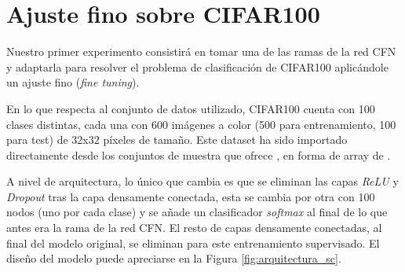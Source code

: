 \documentclass[10pt,a4paper]{article}
\begin{document}
\newpage
\section{Ajuste fino sobre CIFAR100}

Nuestro primer experimento consistirá en tomar una de las ramas de la red CFN y adaptarla para resolver el problema de clasificación de CIFAR100 aplicándole un ajuste fino (\textit{fine tuning}). 

En lo que respecta al conjunto de datos utilizado, CIFAR100 cuenta con 100 clases distintas, cada una con 600 imágenes a color (500 para entrenamiento, 100 para test) de 32x32 píxeles de tamaño. Este dataset ha sido importado directamente desde los conjuntos de muestra que ofrece , en forma de array de . 

A nivel de arquitectura, lo único que cambia es que se eliminan las capas \textit{ReLU} y \textit{Dropout} tras la capa densamente conectada, esta se cambia por otra con 100 nodos (uno por cada clase) y se añade un clasificador \textit{softmax} al final de lo que antes era la rama de la red CFN. El resto de capas densamente conectadas, al final del modelo original, se eliminan para este entrenamiento supervisado. El diseño del modelo puede apreciarse en la Figura \ref{fig:arquitectura_sc}.
\end{document}
